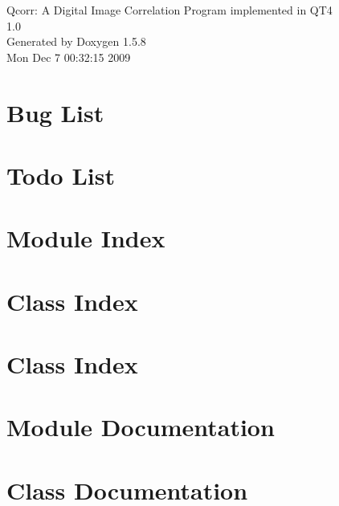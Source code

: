 \documentclass[a4paper]{book}
\begin{document}
\begin{titlepage}
\vspace*{7cm}
\begin{center}
{\Large Qcorr: A Digital Image Correlation Program implemented in QT4 \\[1ex]\large 1.0 }\\
\vspace*{1cm}
{\large Generated by Doxygen 1.5.8}\\
\vspace*{0.5cm}
{\small Mon Dec 7 00:32:15 2009}\\
\end{center}
\end{titlepage}
\clearemptydoublepage
{}
\tableofcontents
\clearemptydoublepage
{}
\chapter{Bug List}
\label{bug}
\hypertarget{bug}{}

\chapter{Todo List}
\label{todo}
\hypertarget{todo}{}

\chapter{Module Index}

\chapter{Class Index}

\chapter{Class Index}

\chapter{Module Documentation}

\chapter{Class Documentation}





\printindex
\end{document}
